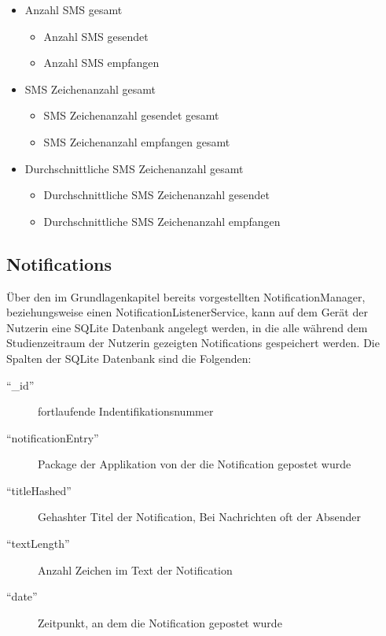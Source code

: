 \begin{itemize}
    \item Anzahl SMS gesamt
    \begin{itemize}
        \item Anzahl SMS gesendet
        \item Anzahl SMS empfangen
    \end{itemize}

    \item SMS Zeichenanzahl gesamt
    \begin{itemize}
        \item SMS Zeichenanzahl gesendet gesamt
        \item SMS Zeichenanzahl empfangen gesamt
    \end{itemize}

    \item Durchschnittliche SMS Zeichenanzahl gesamt
    \begin{itemize}
        \item Durchschnittliche SMS Zeichenanzahl gesendet
        \item Durchschnittliche SMS Zeichenanzahl empfangen
    \end{itemize}

\end{itemize}


\subsection{Notifications}


Über den im Grundlagenkapitel bereits vorgestellten NotificationManager, beziehungsweise einen NotificationListenerService, kann auf dem Gerät der Nutzerin eine SQLite Datenbank angelegt werden,
in die alle während dem Studienzeitraum der Nutzerin gezeigten Notifications gespeichert werden.
Die Spalten der SQLite Datenbank sind die Folgenden:
\begin{description}
    \item ["`\_id"'] fortlaufende Indentifikationsnummer
    \item ["`notificationEntry"'] Package der Applikation von der die Notification gepostet wurde
    \item ["`titleHashed"'] Gehashter Titel der Notification, Bei Nachrichten oft der Absender
    \item ["`textLength"'] Anzahl Zeichen im Text der Notification
    \item ["`date"'] Zeitpunkt, an dem die Notification gepostet wurde
\end{description}

